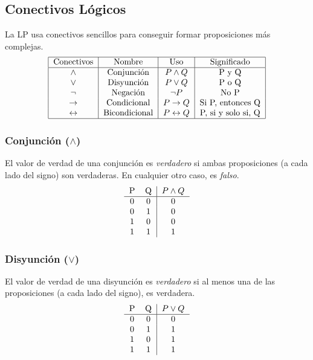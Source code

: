 \documentclass[../main.tex]{subfiles}
\begin{document}
\subsection{Conectivos Lógicos}
La LP usa conectivos sencillos para conseguir formar proposiciones más complejas. \\
\[
    \begin{tabular}{|c|c|c|c|}
        \hline
        Conectivos & Nombre & Uso & Significado\\ \hline
        $\wedge$ & Conjunción & $P \wedge{}Q$ & P y Q \\
        $\vee$ & Disyunción & $P \vee{}Q$ & P o Q \\
        $\neg$ & Negación & $\neg{}P$ & No P \\
        $\rightarrow$ & Condicional & $P \rightarrow{}Q$ & Si P, entonces Q \\
        $\leftrightarrow$ & Bicondicional & $P \leftrightarrow{}Q$ & P, si y solo si, Q \\ \hline
    \end{tabular}
\]
\subsubsection{Conjunción ($\wedge$)}
El valor de verdad de una conjunción es \textit{verdadero} si ambas proposiciones (a cada lado del signo) son verdaderas. En cualquier otro caso, es \textit{falso}.
\[
    \begin{tabular}{cc|c}
        P & Q & $P \wedge{}Q$\\ \hline
        0 & 0 & 0\\
        0 & 1 & 0\\
        1 & 0 & 0\\
        1 & 1 & 1
    \end{tabular}
\]

\subsubsection{Disyunción ($\vee$)}
El valor de verdad de una disyunción es \textit{verdadero} si al menos una de las proposiciones (a cada lado del signo), es verdadera.
\[
    \begin{tabular}{cc|c}
        P & Q & $P \vee{}Q$\\ \hline
        0 & 0 & 0\\
        0 & 1 & 1\\
        1 & 0 & 1\\
        1 & 1 & 1
    \end{tabular}
\]
\end{document}
